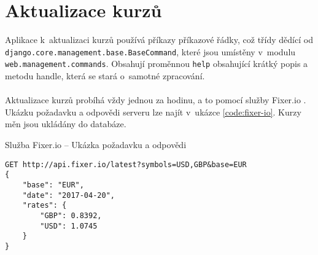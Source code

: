 \section{Aktualizace kurzů}
Aplikace k~aktualizaci kurzů používá příkazy příkazové řádky, což třídy dědící od \texttt{django.core.management.base.BaseCommand}, které jsou umístěny v~modulu \texttt{web.management.commands}. Obsahují proměnnou \texttt{help} obsahující krátký popis a metodu handle, která se stará o~samotné zpracování.
\\\\
Aktualizace kurzů probíhá vždy jednou za hodinu, a to pomocí služby Fixer.io \cite{fixer-io}. Ukázku požadavku a odpovědi serveru lze najít v~ukázce \ref{code:fixer-io}. Kurzy měn jsou ukládány do databáze.

\begin{listing}[h]
\caption{\label{code:fixer-io}Služba Fixer.io -- Ukázka požadavku a odpovědi}
\begin{verbatim}
GET http://api.fixer.io/latest?symbols=USD,GBP&base=EUR
{
    "base": "EUR",
    "date": "2017-04-20",
    "rates": {
        "GBP": 0.8392,
        "USD": 1.0745
    }
}
\end{verbatim}
\end{listing}
